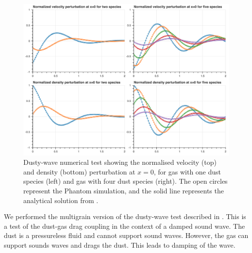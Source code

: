 \documentclass[fleqn,usenatbib]{mnras}
\begin{document}
\begin{figure}
   \begin{center}
      \includegraphics[width=\textwidth]{figs/dustywave.png}
      \caption{Dusty-wave numerical test showing the normalised velocity (top)
         and density (bottom) perturbation at \(x = 0\), for gas with one dust
         species (left) and gas with four dust species (right). The open circles
         represent the Phantom simulation, and the solid line represents the
         analytical solution from
         \citet{Benitez-Llambay2019ApJS..241...25B}.\label{fig:dustywave}}
   \end{center}
\end{figure}

We performed the multigrain version of the dusty-wave test described in
\citet{Laibe2011MNRAS.418.1491L}. This is a test of the dust-gas drag coupling
in the context of a damped sound wave. The dust is a pressureless fluid and
cannot support sound waves. However, the gas can support sounds waves and drags
the dust. This leads to damping of the wave.
\end{document}
